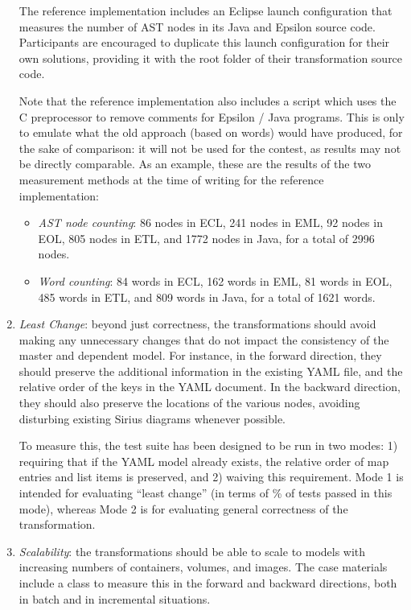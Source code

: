 \documentclass[sigconf,review]{acmart}
\begin{document}
\begin{enumerate}
  The reference implementation includes an Eclipse launch configuration that
  measures the number of AST nodes in its Java and Epsilon source code.
  Participants are encouraged to duplicate this launch configuration for their
  own solutions, providing it with the root folder of their transformation
  source code.

  Note that the reference implementation also includes a 
  script which uses the C preprocessor to remove comments for Epsilon / Java
  programs. This is only to emulate what the old approach (based on words) would
  have produced, for the sake of comparison: it will not be used for the
  contest, as results may not be directly comparable. As an example, these are
  the results of the two measurement methods at the time of writing for the
  reference implementation:

  \begin{itemize}
  \item \emph{AST node counting}: 86 nodes in ECL, 241 nodes in EML, 92 nodes in
    EOL, 805 nodes in ETL, and 1772 nodes in Java, for a total of 2996 nodes.

  \item \emph{Word counting}: 84 words in ECL, 162 words in EML, 81 words in
    EOL, 485 words in ETL, and 809 words in Java, for a total of 1621 words.
  \end{itemize}

\item \emph{Least Change}: beyond just correctness, the transformations should
  avoid making any unnecessary changes that do not impact the consistency of the
  master and dependent model. For instance, in the forward direction, they
  should preserve the additional information in the existing YAML file, and the
  relative order of the keys in the YAML document. In the backward direction,
  they should also preserve the locations of the various nodes, avoiding
  disturbing existing Sirius diagrams whenever possible.

  To measure this, the test suite has been designed to be run in two modes: 1)
  requiring that if the YAML model already exists, the relative order of map
  entries and list items is preserved, and 2) waiving this requirement. Mode 1
  is intended for evaluating ``least change'' (in terms of \% of tests passed in
  this mode), whereas Mode 2 is for evaluating general correctness of the
  transformation.

\item \emph{Scalability}: the transformations should be able to scale to models
  with increasing numbers of containers, volumes, and images. The case materials
  include a  class to measure this in the
  forward and backward directions, both in batch and in incremental situations.

\end{enumerate}
\end{document}
